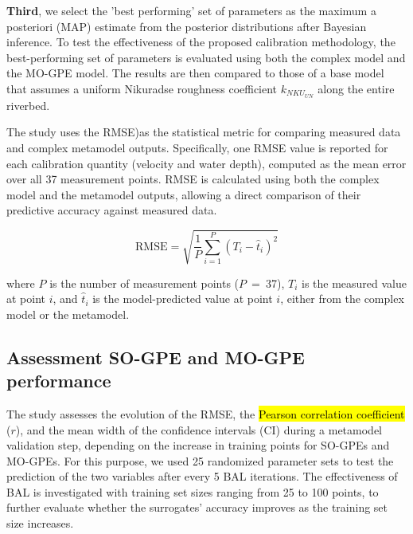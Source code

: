 \documentclass[draft,linenumbers,onecolumn]{agujournal2019} %
\begin{document}
\textbf{Third}, we select the 'best performing' set of parameters as the maximum a posteriori (MAP) estimate from the posterior distributions after Bayesian inference. To test the effectiveness of the proposed calibration methodology, the best-performing set of parameters is evaluated using both the complex model and the MO-GPE model. The results are then compared to those of a base model that assumes a uniform Nikuradse roughness coefficient $k_{NKU_{UN}}$ along the entire riverbed. 

The study uses the RMSE)as the statistical metric for comparing measured data and complex metamodel outputs. Specifically, one RMSE value is reported for each calibration quantity (velocity and water depth), computed as the mean error over all 37 measurement points. RMSE is calculated using both the complex model and the metamodel outputs, allowing a direct comparison of their predictive accuracy against measured data.

\begin{equation}\label{eq:rmse}
	\text{RMSE} = \sqrt{ \frac{1}{P} \sum_{i=1}^{P} (T_i - \hat{t}_i)^2 }
\end{equation}

where $P$ is the number of measurement points ($P$~=~37), $T_i$ is the measured value at point $i$, and $\hat{t}_i$ is the model-predicted value at point $i$, either from the complex model or the metamodel.



\subsection{Assessment SO-GPE and MO-GPE performance}
\label{sec:so-mo-gpe}
The study assesses the evolution of the RMSE, the \hl{Pearson correlation coefficient} ($r$), and the mean width of the confidence intervals (CI) during a metamodel validation step, depending on the increase in training points for SO-GPEs and MO-GPEs. For this purpose, we used 25 randomized parameter sets to test the prediction of the two variables after every 5 BAL iterations. The effectiveness of BAL is investigated with training set sizes ranging from 25 to 100 points, to further evaluate whether the surrogates' accuracy improves as the training set size increases.
\end{document}
